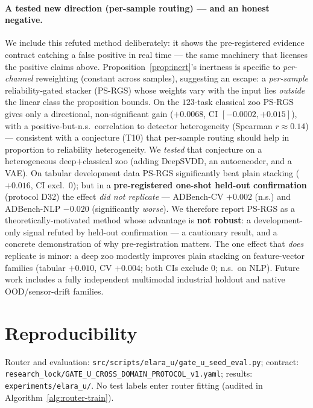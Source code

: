 \documentclass[10pt,conference]{IEEEtran}
\begin{document}
\paragraph{A tested new direction (per-sample routing) --- and an honest negative.}
We include this refuted method deliberately: it shows the pre-registered evidence
contract catching a false positive in real time --- the same machinery that licenses
the positive claims above. Proposition~\ref{prop:inert}'s inertness is specific to
\emph{per-channel} reweighting (constant across samples), suggesting an escape: a
\emph{per-sample} reliability-gated stacker (PS-RGS) whose weights vary with the input
lies \emph{outside} the linear class the proposition bounds. On the $123$-task classical zoo PS-RGS gives only a directional,
non-significant gain ($+0.0068$, CI $[-0.0002,+0.015]$), with a positive-but-n.s.\
correlation to detector heterogeneity (Spearman $r\!\approx\!0.14$) --- consistent with
a conjecture (T10) that per-sample routing should help in proportion to reliability
heterogeneity. We \emph{tested} that conjecture on a heterogeneous deep$+$classical zoo
(adding DeepSVDD, an autoencoder, and a VAE). On tabular development data PS-RGS
significantly beat plain stacking ($+0.016$, CI excl.\ $0$); but in a \textbf{pre-registered
one-shot held-out confirmation} (protocol D32) the effect \emph{did not replicate} ---
ADBench-CV $+0.002$ (n.s.) and ADBench-NLP $-0.020$ (significantly \emph{worse}). We
therefore report PS-RGS as a theoretically-motivated method whose advantage is
\textbf{not robust}: a development-only signal refuted by held-out confirmation --- a
cautionary result, and a concrete demonstration of why pre-registration matters. The
one effect that \emph{does} replicate is minor: a deep zoo modestly improves plain
stacking on feature-vector families (tabular $+0.010$, CV $+0.004$; both CIs exclude
$0$; n.s.\ on NLP). Future work includes a fully independent multimodal industrial
holdout and native OOD/sensor-drift families.

\section{Reproducibility}
Router and evaluation: \texttt{src/scripts/elara\_u/gate\_u\_seed\_eval.py};
contract: \texttt{research\_lock/GATE\_U\_CROSS\_DOMAIN\_PROTOCOL\_v1.yaml};
results: \texttt{experiments/elara\_u/}. No test labels enter router fitting
(audited in Algorithm~\ref{alg:router-train}).
\end{document}

